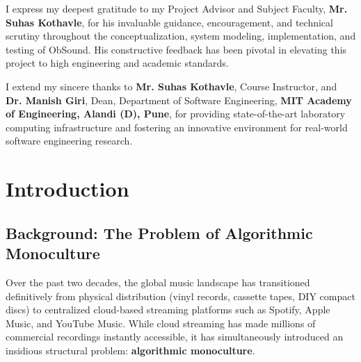 \documentclass[12pt,a4paper,oneside]{report}
\begin{document}
I express my deepest gratitude to my Project Advisor and Subject Faculty, \textbf{Mr. Suhas Kothavle}, for his invaluable guidance, encouragement, and technical scrutiny throughout the conceptualization, system modeling, implementation, and testing of ObSound. His constructive feedback has been pivotal in elevating this project to high engineering and academic standards.

I extend my sincere thanks to \textbf{Mr. Suhas Kothavle}, Course Instructor, and \textbf{Dr. Manish Giri}, Dean, Department of Software Engineering, \textbf{MIT Academy of Engineering, Alandi (D), Pune}, for providing state-of-the-art laboratory computing infrastructure and fostering an innovative environment for real-world software engineering research.

\clearpage

\tableofcontents
\clearpage

\listoffigures
\listoftables
\clearpage

\setcounter{page}{1}

\chapter{Introduction}

\section{Background: The Problem of Algorithmic Monoculture}
Over the past two decades, the global music landscape has transitioned definitively from physical distribution (vinyl records, cassette tapes, DIY compact discs) to centralized cloud-based streaming platforms such as Spotify, Apple Music, and YouTube Music. While cloud streaming has made millions of commercial recordings instantly accessible, it has simultaneously introduced an insidious structural problem: \textbf{algorithmic monoculture}.
\end{document}
